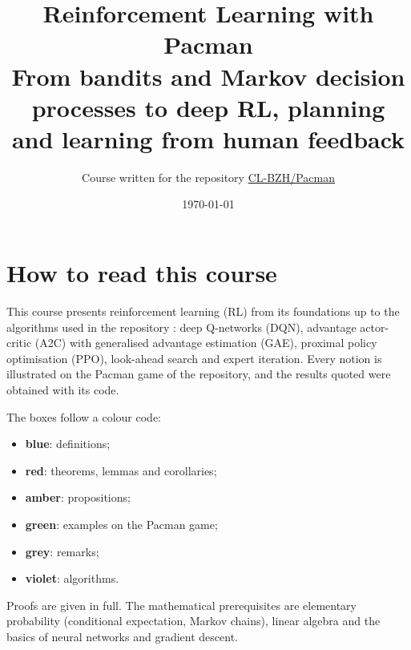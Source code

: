\documentclass[11pt, openany]{book}
\title{\Huge Reinforcement Learning with Pacman\\[1ex]
  \Large From bandits and Markov decision processes to deep RL, planning\\
  and learning from human feedback}
\author{Course written for the repository
  \href{https://github.com/CL-BZH/Pacman}{CL-BZH/Pacman}}
\date{\today}
\begin{document}
\frontmatter
\maketitle
\tableofcontents

\chapter*{How to read this course}
This course presents reinforcement learning (RL) from its foundations up to
the algorithms used in the repository : deep Q-networks
(DQN), advantage actor-critic (A2C) with generalised advantage estimation
(GAE), proximal policy optimisation (PPO), look-ahead search and expert
iteration. Every notion is illustrated on the Pacman game of the repository,
and the results quoted were obtained with its code.

The boxes follow a colour code:
\begin{itemize}[nosep]
  \item \textcolor{defblue}{\textbf{blue}}: definitions;
  \item \textcolor{thmred}{\textbf{red}}: theorems, lemmas and corollaries;
  \item \textcolor{propamber}{\textbf{amber}}: propositions;
  \item \textcolor{pacgreen}{\textbf{green}}: examples on the Pacman game;
  \item \textcolor{remgrey}{\textbf{grey}}: remarks;
  \item \textcolor{algviolet}{\textbf{violet}}: algorithms.
\end{itemize}
Proofs are given in full. The mathematical prerequisites are elementary
probability (conditional expectation, Markov chains), linear algebra and
the basics of neural networks and gradient descent.

\mainmatter

















\backmatter

\end{document}
